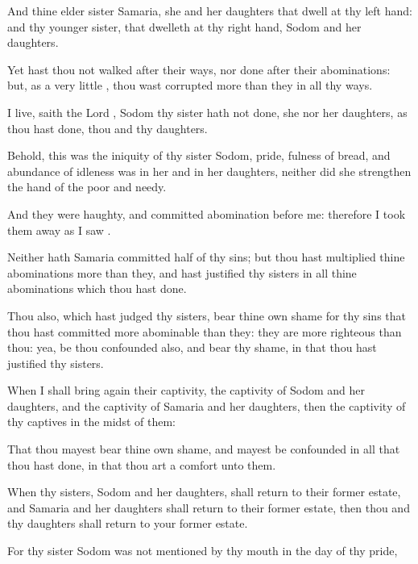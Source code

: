 {And thine
elder
sister
{}
Samaria, she and her
daughters that
dwell at thy left
hand: and thy
younger
sister, that
dwelleth at thy right
hand,
{}
Sodom and her
daughters.

Yet hast thou not
walked after their
ways, nor
done after their
abominations: but, as
{} a
very
little
{}, thou wast
corrupted more than
they in all thy
ways.

 I
live,
saith the
Lord
{},
Sodom thy
sister hath not
done, she nor her
daughters, as thou hast
done, thou and thy
daughters.

Behold, this was the
iniquity of thy
sister
Sodom,
pride,
fulness of
bread, and
abundance of
idleness was in her and in her
daughters, neither did she
strengthen the
hand of the
poor and
needy.

And they were
haughty, and
committed
abomination
before me: therefore I took them
away as I
saw
{}.

Neither hath
Samaria
committed
half of thy
sins; but thou hast
multiplied thine
abominations more than
they, and hast
justified thy
sisters in all thine
abominations which thou hast
done.

Thou also, which hast
judged thy
sisters,
bear thine own
shame for thy
sins that thou hast committed more
abominable than
they: they are more
righteous than thou: yea, be thou
confounded also, and
bear thy
shame, in that thou hast
justified thy
sisters.

When I shall bring
again their
captivity, the
captivity of
Sodom and her
daughters, and the
captivity of
Samaria and her
daughters, then
{} the
captivity of thy
captives in the
midst of them:

That thou mayest
bear thine own
shame, and mayest be
confounded in all that thou hast
done, in that thou art a
comfort unto them.

When thy
sisters,
Sodom and her
daughters, shall
return to their former
estate, and
Samaria and her
daughters shall
return to their former
estate, then thou and thy
daughters shall
return to your former
estate.

For thy
sister
Sodom was not
mentioned by thy
mouth in the
day of thy
pride,

}
